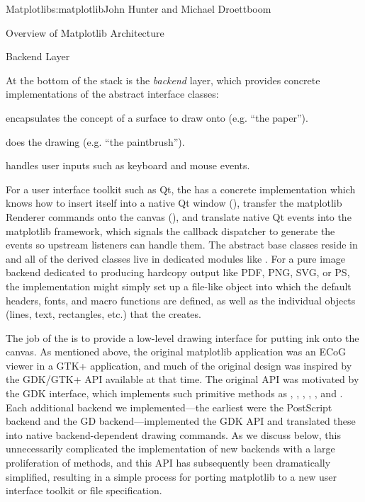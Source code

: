 \begin{aosachapter}{Matplotlib}{s:matplotlib}{John Hunter and Michael Droettboom}
\begin{aosasect1}{Overview of Matplotlib Architecture}
\begin{aosasect2}{Backend Layer}

At the bottom of the stack is the \emph{backend} layer, which provides
concrete implementations of the abstract interface classes:
\begin{aosaitemize}
\item {} encapsulates the concept of a surface to draw
  onto (e.g. ``the paper'').

\item {} does the drawing (e.g. ``the paintbrush'').

\item {} handles user inputs such as keyboard and mouse events.
\end{aosaitemize}

For a user interface toolkit such as Qt, the  has a
concrete implementation which knows how to insert itself into a native
Qt window (), transfer the matplotlib Renderer
commands onto the canvas (), and translate native
Qt events into the matplotlib  framework, which signals the
callback dispatcher to generate the events so upstream listeners can
handle them.  The abstract base classes reside in
 and all of the derived classes live
in dedicated modules like .
For a pure image backend dedicated to producing hardcopy output like
PDF, PNG, SVG, or PS, the  implementation might
simply set up a file-like object into which the default headers,
fonts, and macro functions are defined, as well as the individual
objects (lines, text, rectangles, etc.) that the  creates.

The job of the  is to provide a low-level drawing
interface for putting ink onto the canvas.  As mentioned above, the
original matplotlib application was an ECoG viewer in a GTK+
application, and much of the original design was inspired by the
GDK/GTK+ API available at that time.  The original  API
was motivated by the GDK  interface, which implements
such primitive methods as , ,
, , , and
.  Each additional backend we implemented---the
earliest were the PostScript backend and the GD backend---implemented
the GDK  API and translated these into native 
backend-dependent drawing commands.  As we discuss below, this unnecessarily
complicated the implementation of new backends with a large
proliferation of methods, and this API has subsequently been
dramatically simplified, resulting in a simple process for porting
matplotlib to a new user interface toolkit or file specification.


\end{aosasect2}
\end{aosasect1}
\end{aosachapter}
